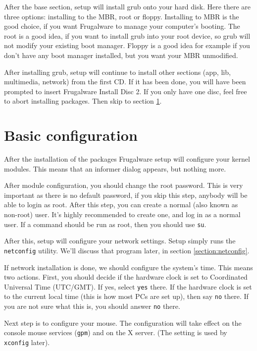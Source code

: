 After the base section, setup will install grub onto your hard disk. Here there are three options: installing to the MBR, root or floppy. Installing to MBR is the good choice, if you want Frugalware to manage your computer's booting. The root is a good idea, if you want to install grub into your root device, so grub will not modify your existing boot manager. Floppy is a good idea for example if you don't have any boot manager installed, but you want your MBR unmodified.

After installing grub, setup will continue to install other sections (app, lib, multimedia, network) from the first CD. If it has been done, you will have been prompted to insert Frugalware Install Disc 2. If you only have one disc, feel free to abort installing packages. Then skip to section \ref{section:baseconfig}.

\section{Basic configuration}
\label{section:baseconfig}

After the installation of the packages Frugalware setup will configure your kernel modules. This means that an informer dialog appears, but nothing more.

After module configuration, you should change the root password. This is very important as there is no default password, if you skip this step, anybody will be able to login as root. After this step, you can create a normal (also known as non-root) user. It's highly recommended to create one, and log in as a normal user. If a command should be run as root, then you should use {\tt su}.

After this, setup will configure your network settings. Setup simply runs the {\tt netconfig} utility. We'll discuss that program later, in section \ref{section:netconfig}.

If network installation is done, we should configure the system's time. This means two actions. First, you should decide if the hardware clock is set to Coordinated Universal Time (UTC/GMT). If yes, select {\tt yes} there. If the hardware clock is set to the current local time (this is how most PCs are set up), then say {\tt no} there. If you are not sure what this is, you should answer {\tt no} there.

Next step is to configure your mouse. The configuration will take effect on the console mouse services ({\tt gpm}) and on the X server. (The setting is used by {\tt xconfig} later). 

